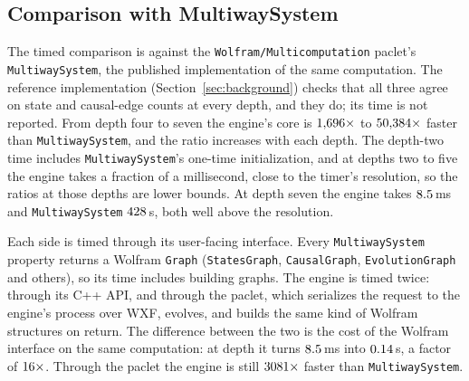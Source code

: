 \subsection{Comparison with MultiwaySystem}
The timed comparison is against the \texttt{Wolfram/\allowbreak Multicomputation} paclet's
\texttt{MultiwaySystem}, the published implementation of the same computation. The reference
implementation (Section~\ref{sec:background}) checks that all three agree on state and causal-edge
counts at every depth, and they do; its time is not reported. From depth four to seven the
engine's core is $1{,}696\times$ to $50{,}384\times$ faster than
\texttt{MultiwaySystem}, and the ratio increases with each depth. The depth-two time includes
\texttt{MultiwaySystem}'s one-time initialization, and at depths two to five the engine takes a
fraction of a millisecond, close to the timer's resolution, so the ratios at those depths are
lower bounds. At depth seven the engine takes $8.5$\,ms and
\texttt{MultiwaySystem} $428$\,s, both well above the resolution.

Each side is timed through its user-facing interface. Every \texttt{MultiwaySystem} property
returns a Wolfram \texttt{Graph} (\texttt{StatesGraph}, \texttt{CausalGraph},
\texttt{EvolutionGraph} and others), so its time includes building graphs. The engine is timed
twice: through its C++ API, and through the paclet, which serializes the request to the engine's
process over WXF, evolves, and builds the same kind of Wolfram structures on return. The difference
between the two is the cost of the Wolfram interface on the same computation: at depth
\SpeedupHighDepth{} it turns $8.5$\,ms into $0.14$\,s, a factor of
$16\times$. Through the paclet the engine is still $3081\times$
faster than \texttt{MultiwaySystem}.

\begin{table}[htbp]
\centering
\caption{Wall time by depth against \texttt{MultiwaySystem} on
\texttt{wolfram-2to4}: $\{\{1,2\},\{2,3\}\} \to
\{\{1,2\},\{2,4\},\{4,3\}\}$ from $\{\{1,2\},\{2,3\}\}$. The engine is timed through its C++ API
and through the paclet (WXF and Wolfram structure construction included); the speedup column
divides \texttt{MultiwaySystem}'s time by the C++ core's. The reference implementation checks the
counts and is not timed.}
\label{tab:t2-speedup}

\end{table}

